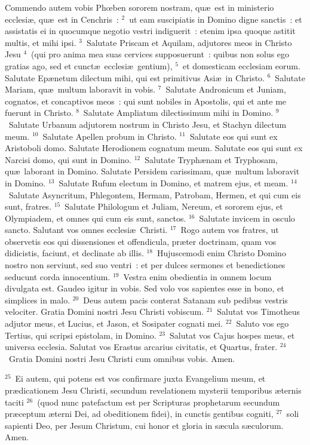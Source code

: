 \lettrine[lines=3,image=true,loversize=0.05,lraise=-0.03]{C}{}ommendo autem vobis Phœben sororem nostram, qu\ae\ est in ministerio ecclesi\ae , qu\ae\ est in Cenchris~:
${}^{2}$~ut eam suscipiatis in Domino digne sanctis~: et assistatis ei in quocumque negotio vestri indiguerit~: etenim ipsa quoque astitit multis, et mihi ipsi.
${}^{3}$~Salutate Priscam et Aquilam, adjutores meos in Christo Jesu
${}^{4}$~(qui pro anima mea suas cervices supposuerunt~: quibus non solus ego gratias ago, sed et cunct\ae\ ecclesi\ae\ gentium),
${}^{5}$~et domesticam ecclesiam eorum. Salutate Ep\ae netum dilectum mihi, qui est primitivus Asi\ae\ in Christo.
${}^{6}$~Salutate Mariam, qu\ae\ multum laboravit in vobis.
${}^{7}$~Salutate Andronicum et Juniam, cognatos, et concaptivos meos~: qui sunt nobiles in Apostolis, qui et ante me fuerunt in Christo.
${}^{8}$~Salutate Ampliatum dilectissimum mihi in Domino.
${}^{9}$~Salutate Urbanum adjutorem nostrum in Christo Jesu, et Stachyn dilectum meum.
${}^{10}$~Salutate Apellen probum in Christo.
${}^{11}$~Salutate eos qui sunt ex Aristoboli domo. Salutate Herodionem cognatum meum. Salutate eos qui sunt ex Narcisi domo, qui sunt in Domino.
${}^{12}$~Salutate Tryph\ae nam et Tryphosam, qu\ae\ laborant in Domino. Salutate Persidem carissimam, qu\ae\ multum laboravit in Domino.
${}^{13}$~Salutate Rufum electum in Domino, et matrem ejus, et meam.
${}^{14}$~Salutate Asyncritum, Phlegontem, Hermam, Patrobam, Hermen, et qui cum eis sunt, fratres.
${}^{15}$~Salutate Philologum et Juliam, Nereum, et sororem ejus, et Olympiadem, et omnes qui cum eis sunt, sanctos.
${}^{16}$~Salutate invicem in osculo sancto. Salutant vos omnes ecclesi\ae\ Christi.
${}^{17}$~Rogo autem vos fratres, ut observetis eos qui dissensiones et offendicula, pr\ae ter doctrinam, quam vos didicistis, faciunt, et declinate ab illis.
${}^{18}$~Hujuscemodi enim Christo Domino nostro non serviunt, sed suo ventri~: et per dulces sermones et benedictiones seducunt corda innocentium.
${}^{19}$~Vestra enim obedientia in omnem locum divulgata est. Gaudeo igitur in vobis. Sed volo vos sapientes esse in bono, et simplices in malo.
${}^{20}$~Deus autem pacis conterat Satanam sub pedibus vestris velociter. Gratia Domini nostri Jesu Christi vobiscum.
${}^{21}$~Salutat vos Timotheus adjutor meus, et Lucius, et Jason, et Sosipater cognati mei.
${}^{22}$~Saluto vos ego Tertius, qui scripsi epistolam, in Domino.
${}^{23}$~Salutat vos Cajus hospes meus, et universa ecclesia. Salutat vos Erastus arcarius civitatis, et Quartus, frater.
${}^{24}$~Gratia Domini nostri Jesu Christi cum omnibus vobis. Amen.


${}^{25}$~Ei autem, qui potens est vos confirmare juxta Evangelium meum, et pr\ae dicationem Jesu Christi, secundum revelationem mysterii temporibus \ae ternis taciti
${}^{26}$~(quod nunc patefactum est per Scripturas prophetarum secundum pr\ae ceptum \ae terni Dei, ad obeditionem fidei), in cunctis gentibus cogniti,
${}^{27}$~soli sapienti Deo, per Jesum Christum, cui honor et gloria in s\ae cula s\ae culorum. Amen.
